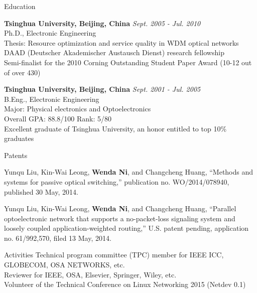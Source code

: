 \documentclass{resume} %
\begin{document}
\begin{rSection}{Education}

{\bf Tsinghua University, Beijing, China} \hfill {\em Sept. 2005 - Jul. 2010} \\ 
Ph.D., Electronic Engineering \\
Thesis: Resource optimization and service quality in WDM optical networks \\
DAAD (Deutscher Akademischer Austausch Dienst) research fellowship \\
Semi-finalist for the 2010 Corning Outstanding Student Paper Award (10-12 out of over 430)

{\bf Tsinghua University, Beijing, China} \hfill {\em Sept. 2001 - Jul. 2005} \\ 
B.Eng., Electronic Engineering \\
Major: Physical electronics and Optoelectronics \\
Overall GPA: 88.8/100 Rank: 5/80 \\
Excellent graduate of Tsinghua University, an honor entitled to top 10\% graduates

\end{rSection}



\begin{rSection}{Patents}

Yunqu Liu, Kin-Wai Leong, \textbf{Wenda Ni}, and Changcheng Huang, ``Methods and systems for passive optical switching,'' publication no. WO/2014/078940, published 30 May, 2014.

Yunqu Liu, Kin-Wai Leong, \textbf{Wenda Ni}, and Changcheng Huang, ``Parallel optoelectronic network that supports a no-packet-loss signaling system and loosely coupled application-weighted routing,'' U.S. patent pending, application no. 61/992,570, filed 13 May, 2014.
\end{rSection}



\begin{rSection}{Activities}
Technical program committee (TPC) member for IEEE ICC, GLOBECOM, OSA NETWORKS, etc. \\
Reviewer for IEEE, OSA, Elsevier, Springer, Wiley, etc. \\
Volunteer of the Technical Conference on Linux Networking 2015 (Netdev 0.1)
\end{rSection}


\end{document}

